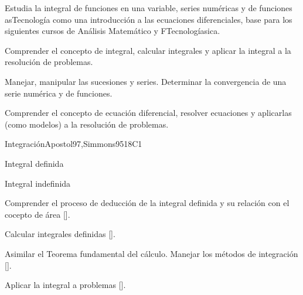 \begin{syllabus}


\begin{justification}
Estudia la integral de funciones en una variable, series numéricas y de funciones asTecnología como una introducción a las ecuaciones diferenciales, base para los siguientes cursos de Análisis Matemático y FTecnologíasica.
\end{justification}

\begin{goals}
\item Comprender el concepto de integral, calcular integrales y aplicar la integral a la resolución de problemas.
\item Manejar, manipular las sucesiones y series. Determinar la convergencia de una serie numérica y de funciones.
\item Comprender el concepto de ecuación diferencial, resolver ecuaciones y aplicarlas (como modelos) a la resolución de problemas.
\end{goals}

\begin{outcomes}
    \item {}
    \item {}
\end{outcomes}

\begin{competences}
    \item {} 
    \item {} 
    \item {} 
\end{competences}

\begin{unit}{}{Integración}{Apostol97,Simmons95}{18}{C1}
   \begin{topics}
      \item Integral definida
      \item Integral indefinida
   \end{topics}

   \begin{learningoutcomes}
      \item Comprender el proceso de deducción de la integral definida y su relación con el cocepto de área [\Usage].
      \item Calcular integrales definidas [\Usage].
      \item Asimilar el Teorema fundamental del cálculo. Manejar los métodos de integración [\Usage].
      \item Aplicar la integral a problemas [\Usage].
   \end{learningoutcomes}
\end{unit}


\end{syllabus}

